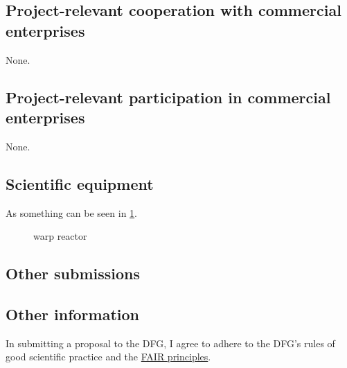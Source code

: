 \documentclass{scrartcl}
\begin{document}
\subsection{Project-relevant cooperation with commercial enterprises}
None.

\subsection{Project-relevant participation in commercial enterprises}
None.

\subsection{Scientific equipment}
As something can be seen in \cref{fig:some_nice_graph}.

\begin{figure}
\centering
{}
\caption{warp reactor}
\label{fig:some_nice_graph}
\end{figure}

\subsection{Other submissions}

\subsection{Other information}
In submitting a proposal to the DFG, I agree to adhere to the DFG's rules of good scientific practice and the \href{https://www.nature.com/articles/sdata201618}{FAIR principles}.

\end{document}
